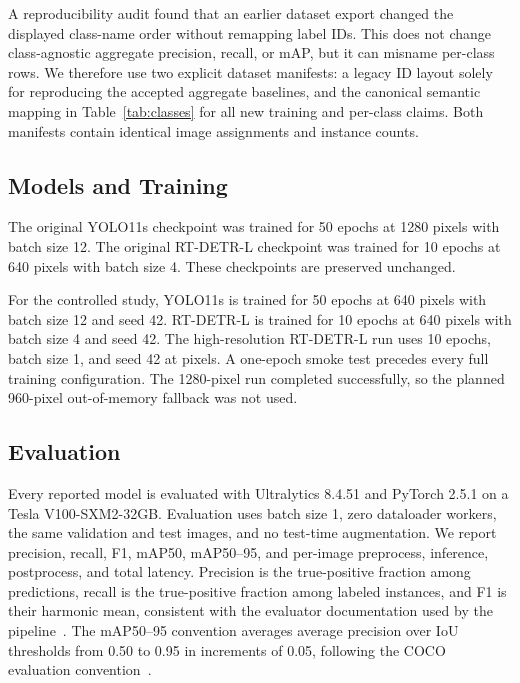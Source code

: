 \documentclass[runningheads]{llncs}
\begin{document}
A reproducibility audit found that an earlier dataset export changed
the displayed class-name order without remapping label IDs. This does
not change class-agnostic aggregate precision, recall, or mAP, but it
can misname per-class rows. We therefore use two explicit dataset
manifests: a legacy ID layout solely for reproducing the accepted
aggregate baselines, and the canonical semantic mapping in
Table~\ref{tab:classes} for all new training and per-class claims.
Both manifests contain identical image assignments and instance counts.

\subsection{Models and Training}

The original YOLO11s checkpoint was trained for 50 epochs at 1280 pixels
with batch size 12. The original RT-DETR-L checkpoint was trained for
10 epochs at 640 pixels with batch size 4. These checkpoints are
preserved unchanged.

For the controlled study, YOLO11s is trained for 50 epochs at 640 pixels
with batch size 12 and seed 42. RT-DETR-L is trained for 10 epochs at
640 pixels with batch size 4 and seed 42. The high-resolution
RT-DETR-L run uses 10 epochs, batch size 1, and seed 42 at
\HighRTImageSize{} pixels. A one-epoch smoke test precedes every full
training configuration. The 1280-pixel run completed successfully, so
the planned 960-pixel out-of-memory fallback was not used.

\subsection{Evaluation}

Every reported model is evaluated with Ultralytics 8.4.51 and PyTorch
2.5.1 on a Tesla V100-SXM2-32GB. Evaluation uses batch size 1, zero
dataloader workers, the same validation and test images, and no
test-time augmentation. We report precision, recall, F1, mAP50,
mAP50--95, and per-image preprocess, inference, postprocess, and total
latency. Precision is the true-positive fraction among predictions,
recall is the true-positive fraction among labeled instances, and F1 is
their harmonic mean, consistent with the evaluator documentation
used by the pipeline~\cite{ultralytics2026metrics}. The mAP50--95
convention averages average precision over IoU
thresholds from 0.50 to 0.95 in increments of 0.05, following the
COCO evaluation convention~\cite{lin2014coco}.
\end{document}
